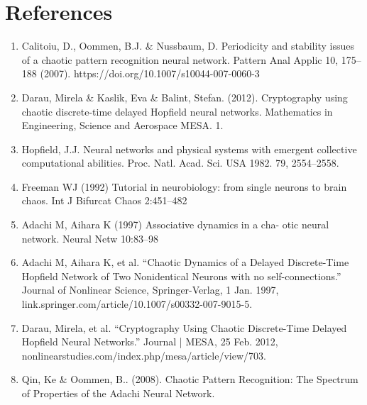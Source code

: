 \documentclass[12pt, letterpaper]{article}
\begin{document}
\section*{References}

\fontsize{8}{12}\selectfont

\begin{enumerate}[leftmargin=*]
    \item Calitoiu, D., Oommen, B.J. \& Nussbaum, D. Periodicity and stability issues of a chaotic pattern recognition neural network. Pattern Anal Applic 10, 175–188 (2007). https://doi.org/10.1007/s10044-007-0060-3
    \item Darau, Mirela \& Kaslik, Eva \& Balint, Stefan. (2012). Cryptography using chaotic discrete-time delayed Hopfield neural networks. Mathematics in Engineering, Science and Aerospace MESA. 1.
    \item Hopfield, J.J. Neural networks and physical systems with emergent collective computational abilities.
    Proc. Natl. Acad. Sci. USA 1982. 79, 2554–2558.
    \item Freeman WJ (1992) Tutorial in neurobiology: from single neurons to brain chaos. Int J Bifurcat Chaos 2:451–482
    \item Adachi M, Aihara K (1997) Associative dynamics in a cha- otic neural network. Neural Netw 10:83–98
    \item Adachi M, Aihara K, et al. “Chaotic Dynamics of a Delayed Discrete-Time Hopfield Network of Two Nonidentical Neurons with no self-connections.” Journal of Nonlinear Science, Springer-Verlag, 1 Jan. 1997, link.springer.com/article/10.1007/s00332-007-9015-5.
    \item Darau, Mirela, et al. “Cryptography Using Chaotic Discrete-Time Delayed Hopfield Neural Networks.” Journal | MESA, 25 Feb. 2012, nonlinearstudies.com/index.php/mesa/article/view/703.
    \item Qin, Ke \& Oommen, B.. (2008). Chaotic Pattern Recognition: The Spectrum of Properties of the Adachi Neural Network.
\end{enumerate}
\end{document}
